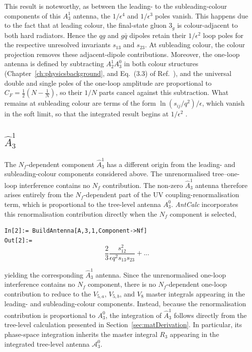 This result is noteworthy, as between the leading- to the subleading-colour components of this $A_3^1$ antenna, 
the $1/\epsilon^4$ and $1/\epsilon^3$ poles vanish. This happens due to the fact that at leading 
colour, the final-state gluon $3_g$ is colour-adjacent to both hard radiators. Hence the 
$qg$ and $g\bar q$ dipoles retain their $1/\epsilon^2$ loop poles for the respective 
unresolved invariants $s_{13}$ and $s_{23}$. At subleading colour, the colour projection removes 
these adjacent-dipole contributions. Moreover, the one-loop antenna is defined by subtracting 
$A_2^1A_3^0$ in both colour structures (Chapter~\ref{ch:physicsbackground}, and Eq.~(3.3) of
Ref.~\cite{Gehrmann-DeRidder:2005btv}), and the universal double and single poles of the 
one-loop amplitude are proportional to $C_F=\frac12\left(N-\frac1N\right)$, so their $1/N$ 
parts cancel against this subtraction. What remains at subleading colour are terms of the 
form $\ln(s_{ij}/q^2)/\epsilon$, which vanish in the soft limit, so that the integrated 
result begins at $1/\epsilon^2$ \cite{Gehrmann-DeRidder:2005btv}.

\subsection{$\hat A_3^1$}\label{subsec:A31nf}

The $N_f$-dependent component $\widehat A_3^1$ has a different origin from the
leading- and subleading-colour components considered above. The unrenormalised
tree--one-loop interference contains no $N_f$ contribution. The non-zero
$\widehat A_3^1$ antenna therefore arises entirely from the $N_f$-dependent part of
the UV coupling-renormalisation term, which is proportional to the tree-level
antenna $A_3^0$. \textit{AntCalc} incorporates this renormalisation contribution
directly when the $N_f$ component is selected,

\begin{mdframed}[backgroundcolor=gray!10, linewidth=0pt]
\texttt{In[2]:= BuildAntenna[A,3,1,Component->Nf]}\\
\hfill
\texttt{Out[2]:=}
    \begin{equation*}
        \frac23\frac{s_{12}^2}{\epsilon q^2 s_{13}s_{23}}+...
    \end{equation*}
\end{mdframed}

yielding the corresponding $\widehat A_3^1$ antenna. Since the unrenormalised
one-loop interference contains no $N_f$ component, there is no $N_f$-dependent
one-loop contribution to reduce to the $V_{5,a}$, $V_{5,b}$, and $V_8$ master
integrals appearing in the leading- and subleading-colour components. Instead,
because the renormalisation contribution is proportional to $A_3^0$, the integration
of $\widehat A_3^1$ follows directly from the tree-level calculation presented in
Section~\ref{sec:matDerivation}. In particular, its phase-space integration inherits
the master integral $R_3$ appearing in the integrated tree-level antenna
$\mathcal A_3^0$.

